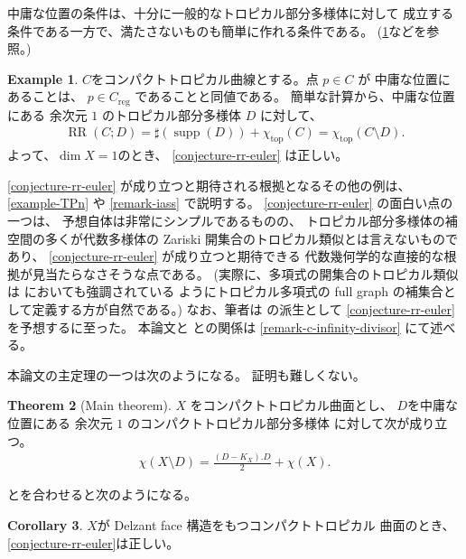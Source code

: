 \documentclass[a4paper,dvipdfmx,reqno,12pt]{amsart}
\theoremstyle{definition}
\newtheorem{theorem}{Theorem}[section]
\newtheorem{example}[theorem]{Example}
\newtheorem{corollary}[theorem]{Corollary}
\newcommand{\opn}[1]{\operatorname{#1}}
\numberwithin{equation}{section}
\begin{document}
中庸な位置の条件は、十分に一般的なトロピカル部分多様体に対して
成立する条件である一方で、満たさないものも簡単に作れる条件である。
(\cref{example-permissible-point}などを参照。)

\begin{example}
\label{example-permissible-point}
$C$をコンパクトトロピカル曲線とする。点 $p\in C$ が
中庸な位置にあることは、
$p\in C_{\opn{reg}}$ であることと同値である。
簡単な計算から、中庸な位置にある
余次元 $1$ のトロピカル部分多様体
$D$ に対して、
\begin{align}
\opn{RR}(C;D)=\sharp (\opn{supp}(D))+ \chi_{\opn{top}}(C)
=\chi_{\opn{top}}(C\setminus D).
\end{align}
よって、$\dim X=1$のとき、
\cref{conjecture-rr-euler}
は正しい。
\end{example}

\cref{conjecture-rr-euler}
が成り立つと期待される根拠となるその他の例は、
\cref{example-TPn} や
\cref{remark-iass} で説明する。
\cref{conjecture-rr-euler} の面白い点の一つは、
予想自体は非常にシンプルであるものの、
トロピカル部分多様体の補空間の多くが代数多様体の
Zariski 開集合のトロピカル類似とは言えないものであり、
\cref{conjecture-rr-euler} が成り立つと期待できる
代数幾何学的な直接的な根拠が見当たらなさそうな点である。
(実際に、多項式の開集合のトロピカル類似は
\cite[Remark 3.5 and Example 3.6]{MR2275625} 
においても強調されている
ようにトロピカル多項式の full graph 
\cite[]{MR2275625}
の補集合として定義する方が自然である。)
なお、筆者は \cite{tsutsui2023graded} 
の派生として \cref{conjecture-rr-euler}
を予想するに至った。
本論文と \cite{tsutsui2023graded}
との関係は \cref{remark-c-infinity-divisor}
にて述べる。

本論文の主定理の一つは次のようになる。
証明も難しくない。
\begin{theorem}[{Main theorem}]
\label{theorem-rr-euler-surface}
$X$ をコンパクトトロピカル曲面とし、
$D$を中庸な位置にある
余次元 $1$ のコンパクトトロピカル部分多様体
に対して次が成り立つ。
\begin{align}
\chi(X\setminus D)=\frac{(D-K_X). D}{2}+
\chi(X).
\end{align}
\end{theorem}
\cite[Theorem 6.3]{demedrano2023chern}
とを合わせると次のようになる。
\begin{corollary}
\label{corollary-ds-euler-rr}
$X$が Delzant face 構造をもつコンパクトトロピカル
曲面のとき、 \cref{conjecture-rr-euler}は正しい。
\end{corollary}
\end{document}
